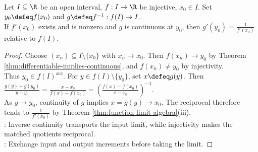 \begin{theorem} \label{thm:inverse-function-derivative-one-variable} \\
Let $I\subseteq\R$ be an open interval, $f:I\to\R$ be injective, $x_0\in I$. Set $y_0\defeq f(x_0)$ and $g\defeq f^{-1}:f(I)\to I$.\\
If $f'(x_0)$ exists and is nonzero and $g$ is continuous at $y_0$, then $g'(y_0)=\frac{1}{f'(x_0)}$ relative to $f(I)$.
\begin{proof}
Choose $(x_n)\subseteq I\setminus\{x_0\}$ with $x_n\to x_0$. Then $f(x_n)\to y_0$ by Theorem \ref{thm:differentiable-implies-continuous}, and $f(x_n)\neq y_0$ by injectivity.\\
Thus $y_0\in f(I)^{\operatorname{acc}}$. For $y\in f(I)\setminus\{y_0\}$, set $x\defeq g(y)$. Then $\frac{g(y)-g(y_0)}{y-y_0}=\frac{x-x_0}{f(x)-f(x_0)}=\left(\frac{f(x)-f(x_0)}{x-x_0}\right)^{-1}$.\\
As $y\to y_0$, continuity of $g$ implies $x=g(y)\to x_0$. The reciprocal therefore tends to $\frac{1}{f'(x_0)}$ by Theorem \ref{thm:function-limit-algebra}(iii).\\
: Inverse continuity transports the input limit, while injectivity makes the matched quotients reciprocal.\\
: Exchange input and output increments before taking the limit.
\end{proof}
\end{theorem}

